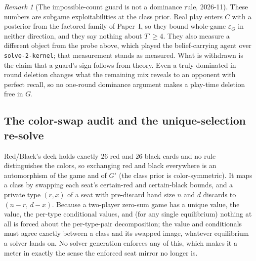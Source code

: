 \documentclass[11pt]{article}
\theoremstyle{plain}
\theoremstyle{definition}
\theoremstyle{remark}
\newtheorem{remark}[theorem]{Remark}
\newcommand{\code}[1]{\texttt{\small #1}}
\newcommand{\game}{\ensuremath{G}}
\newcommand{\gp}{\ensuremath{G'}}
\newcommand{\epsG}{\ensuremath{\varepsilon_{\game}}}
\begin{document}
\begin{remark}[The impossible-count guard is not a dominance rule, 2026-11]
These numbers are subgame exploitabilities at the class prior. Real
play enters $C$ with a posterior from the factored family of Paper~I,
so they bound whole-game $\epsG$ in neither direction, and they say
nothing about $T'\ge4$. They also measure a different object from the
probe above, which played the belief-carrying agent over
\code{solve-2-kernel}; that measurement stands as measured. What is
withdrawn is the claim that a guard's sign follows from theory. Even a
truly dominated in-round deletion changes what the remaining mix
reveals to an opponent with perfect recall, so no one-round dominance
argument makes a play-time deletion free in $\game$.
\end{remark}

\subsection{The color-swap audit and the unique-selection re-solve}
\label{sec:colorswap}

Red/Black's deck holds exactly $26$ red and $26$ black cards and no rule
distinguishes the colors, so exchanging red and black everywhere is an
automorphism of the game and of $\gp$ (the class prior is
color-symmetric). It maps a class by swapping each seat's certain-red
and certain-black bounds, and a private type $(r,x)$ of a seat with
pre-discard hand size $n$ and $d$ discards to $(n-r,\,d-x)$. Because a
two-player zero-sum game has a unique value, the value, the per-type
conditional values, and (for any single equilibrium) nothing at all is
forced about the per-type-pair decomposition; the value and conditionals
must agree exactly between a class and its swapped image, whatever
equilibrium a solver lands on. No solver generation enforces any of
this, which makes it a meter in exactly the sense the enforced seat
mirror no longer is.
\end{document}
